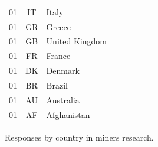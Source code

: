 \documentclass[
  printed, %
  table,   %
  lof,     %
  lot,     %
           oneside, color
]{fithesis3}
\begin{document}
\begin{figure}[H]
\begin{tabular}{ccl}
01                            & IT                         & Italy                 \\
01                            & GR                         & Greece                \\
01                            & GB                         & United Kingdom        \\
01                            & FR                         & France                \\
01                            & DK                         & Denmark               \\
01                            & BR                         & Brazil                \\
01                            & AU                         & Australia             \\
01                            & AF                         & Afghanistan           \\
\end{tabular}
\caption{Responses by country in miners research.}
\label{table:countriesminers}
\end{figure}


\label{monero-user-study-pdf}


\label{monero-miners-study-pdf}

%
%
\end{document}
